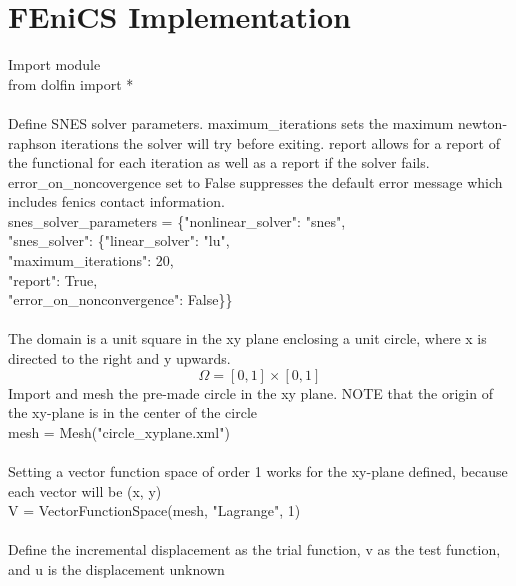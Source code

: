 \documentclass[12pt,3p]{article}
\begin{document}
\section{FEniCS Implementation}
Import module \\
{\selectfont
from dolfin import * \\ \\
}
Define SNES solver parameters. {\selectfont maximum\_iterations} sets the maximum newton-raphson iterations the solver will try before exiting. {\selectfont report} allows for a report of the functional for each iteration as well as a report if the solver fails. {\selectfont error\_on\_noncovergence} set to False suppresses the default error message which includes fenics contact information. \\
{\selectfont
snes\_solver\_parameters = \{"nonlinear\_solver": "snes", \\
\indent \indent \indent \indent \indent \indent \indent \indent \indent \indent \indent "snes\_solver": \{"linear\_solver": "lu",	\\
\indent \indent \indent \indent \indent \indent \indent \indent \indent \indent \indent \indent \indent \indent \indent "maximum\_iterations": 20, \\
\indent \indent \indent \indent \indent \indent \indent \indent \indent \indent \indent \indent \indent \indent \indent "report": True, \\
\indent \indent \indent \indent \indent \indent \indent \indent \indent \indent \indent \indent \indent \indent \indent "error\_on\_nonconvergence": False\}\} \\ \\
}
The domain is a unit square in the xy plane enclosing a unit circle, where x is directed to the right and y upwards. 
\[ \Omega = [0,1] \times [0,1] \] 
Import and mesh the pre-made circle in the xy plane. NOTE that the origin of the xy-plane is in the center of the circle \\
{\selectfont
mesh = Mesh("circle\_xyplane.xml") \\ \\
}
Setting a vector function space of order 1 works for the xy-plane defined, because each vector will be (x, y) \\
{\selectfont
V = VectorFunctionSpace(mesh, "Lagrange", 1) \\ \\
}
Define the incremental displacement as the trial function, v as the test function, and u is the displacement unknown \\
\end{document}
